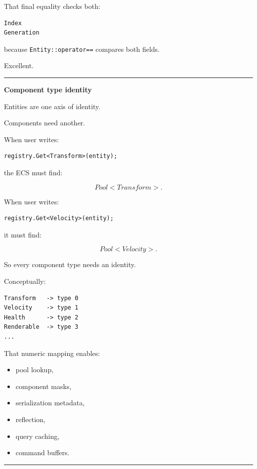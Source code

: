 That final equality checks both:

\begin{verbatim}
Index
Generation
\end{verbatim}

because \texttt{Entity::operator==} compares both fields.

Excellent.

\begin{center}\rule{0.5\linewidth}{0.5pt}\end{center}

\textbf{Component type identity}

Entities are one axis of identity.

Components need another.

When user writes:

\begin{verbatim}
registry.Get<Transform>(entity);
\end{verbatim}

the ECS must find:

\[
Pool<Transform>.
\]

When user writes:

\begin{verbatim}
registry.Get<Velocity>(entity);
\end{verbatim}

it must find:

\[
Pool<Velocity>.
\]

So every component type needs an identity.

Conceptually:

\begin{verbatim}
Transform   -> type 0
Velocity    -> type 1
Health      -> type 2
Renderable  -> type 3
...
\end{verbatim}

That numeric mapping enables:

\begin{itemize}
\tightlist
\item
  pool lookup,
\item
  component masks,
\item
  serialization metadata,
\item
  reflection,
\item
  query caching,
\item
  command buffers.
\end{itemize}

\begin{center}\rule{0.5\linewidth}{0.5pt}\end{center}

